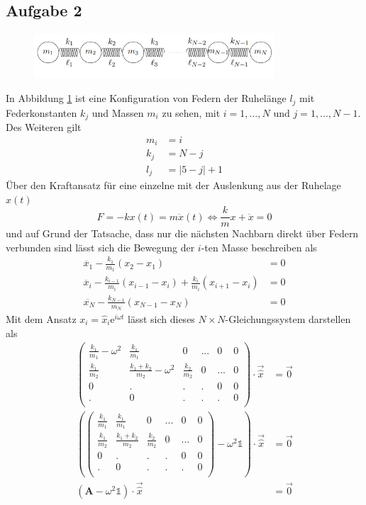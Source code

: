 \subsection*{Aufgabe 2}

\begin{figure}[h!]
\centering
\includegraphics[width=0.8\textwidth]{content/images/Federn.png}
\label{fig:federn}
\end{figure}

\noindent In Abbildung \ref{fig:federn} ist eine Konfiguration von Federn der Ruhelänge $l_j$ mit Federkonstanten $k_j$ und Massen $m_i$ zu sehen, mit $i=1,...,N$ und $j = 1,...,N-1$. Des Weiteren gilt
\begin{align*}
m_i &= i\\
k_j &= N - j\\
l_j &= |5 - j| + 1
\end{align*}
Über den Kraftansatz für eine einzelne mit der Auslenkung aus der Ruhelage $x(t)$
\[
F = -kx(t) = m \ddot{x}(t) \Leftrightarrow {\frac{k}{m}}x + \ddot{x} = 0
\]
und auf Grund der Tatsache, dass nur die nächsten Nachbarn direkt über Federn verbunden sind lässt sich die Bewegung der $i$-ten Masse beschreiben als
\begin{align*}
\ddot{x_1} - \frac{k_1}{m_1}(x_2-x_1) &= 0\\
\ddot{x_i} - \frac{k_{i-1}}{m_i}(x_{i-1}-x_i)+\frac{k_i}{m_i}(x_{i+1}-x_i) &= 0\\
\ddot{x_N} - \frac{k_{N-1}}{m_N}(x_{N-1}-x_N) &= 0
\end{align*}
Mit dem Ansatz $x_i = \hat{x}_i\mathrm{e}^{i\omega t}$ lässt sich dieses $N\times N$-Gleichungssystem darstellen als
\begin{align*}
\begin{pmatrix}
\frac{k_1}{m_1}-\omega^2 & \frac{k_1}{m_1} & 0 & ... & 0 & 0\\
\frac{k_1}{m_2} & \frac{k_1+k_2}{m_2}- \omega^2 & \frac{k_2}{m_2} & 0 & ... & 0\\
0 & . & . & . & 0 & 0\\
. & 0 & . & . & . & 0\\
\end{pmatrix}\cdot\vec{\hat{x}} &= \vec{0}\\
\left(\begin{pmatrix}
\frac{k_1}{m_1} & \frac{k_1}{m_1} & 0 & ... & 0 & 0\\
\frac{k_1}{m_2} & \frac{k_1+k_2}{m_2} & \frac{k_2}{m_2} & 0 & ... & 0\\
0 & . & . & . & 0 & 0\\
. & 0 & . & . & . & 0\\
\end{pmatrix} - \omega^2\mathds{1}\right) \cdot\vec{\hat{x}} &= \vec{0}\\
\left(\mathbf{A}- \omega^2\mathds{1}\right) \cdot\vec{\hat{x}} &= \vec{0}
\end{align*}
